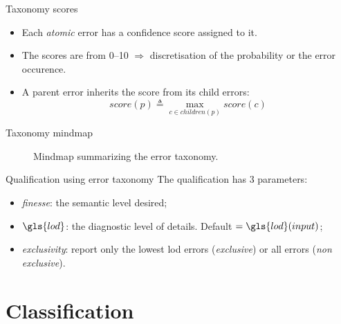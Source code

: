 \documentclass{beamer}
\begin{document}
            \begin{frame}{Taxonomy scores}
                \begin{itemize}[label=$\blacktriangleright$, font=\color{IGNGreen}]
                    \item<1-> Each \emph{atomic} error has a confidence score assigned to it.
                    \item<2-> The scores are from \numrange{0}{10} $\Rightarrow$ discretisation of the probability or the error occurence.
                    \item<3-> A parent error inherits the score from its child errors:
                    \begin{equation*}
                        score(p) \triangleq \max_{c \in children(p)} score(c)
                    \end{equation*}
                \end{itemize}
            \end{frame}
            \begin{frame}{Taxonomy mindmap}
                \begin{figure}
                    
                    \caption{\label{fig::mindmap} Mindmap summarizing the error taxonomy.}
                \end{figure}
            \end{frame}
            \begin{frame}{Qualification using error taxonomy}
                The qualification has $3$ parameters:
                \begin{itemize}[label=$\blacktriangleright$, font=\color{IGNGreen}]
                    \item<1-> \emph{finesse}: the semantic level desired;
                    \item<2-> $\gls{lod}$: the diagnostic level of details. Default $ = \gls{lod}(input) $;
                    \item<3-> \emph{exclusivity}: report only the lowest \gls{lod} errors (\emph{exclusive}) or all errors (\emph{non exclusive}).
                \end{itemize}
            \end{frame}
    \section{Classification}
\end{document}
